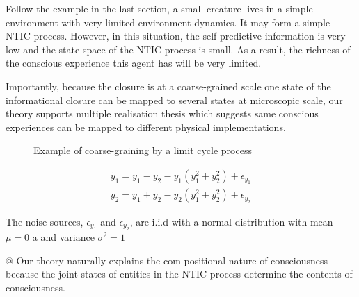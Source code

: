 \documentclass[utf8]{article}
\begin{document}
        Follow the example in the last section, a small creature lives in a simple environment with very limited environment dynamics. It may form a simple NTIC process. However, in this situation, the self-predictive information is very low and the state space of the NTIC process is small. As a result, the richness of the conscious experience this agent has will be very limited. 
        
        Importantly, because the closure is at a coarse-grained scale one state of the informational closure can be mapped to several states at microscopic scale, our theory supports multiple realisation thesis  which suggests same conscious experiences can be mapped to different physical implementations. 
        
        \begin{WritingMaterials}
    		\begin{figure}[H]
    			\label{fig:limitCycle}
    			\caption{Example of coarse-graining by a limit cycle process}
    		\end{figure}
    		
    
    		\begin{equation}\label{eq:LimitCycleExample}
                \begin{array}{l}{\dot{y_1}=y_1-y_2-y_1\left(y_1^{2}+y_2^{2} \right)+\epsilon_{y_1}} \\ {\dot{y_2}=y_1+y_2-y_2\left(y_1^{2}+y_2^{2}\right)+\epsilon_{y_2}}\end{array}
    		\end{equation}    		
    		
    		The noise sources, $\epsilon_{y_1}$ and $\epsilon_{y_2}$, are i.i.d with a normal distribution with mean $\mu=0$ a and variance $\sigma^{2}=1$     
		
        
            @ Our theory naturally explains the com positional nature of consciousness because the joint states of entities in the NTIC process determine the contents of consciousness.

		\end{WritingMaterials}
			
			
			
\end{document}
